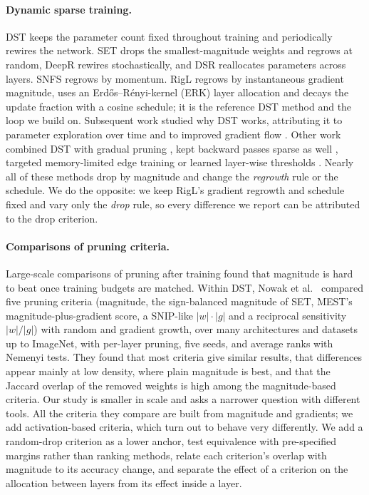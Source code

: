 \paragraph{Dynamic sparse training.}
DST keeps the parameter count fixed throughout training and periodically rewires the network. SET \cite{mocanu2018scalable} drops the smallest-magnitude weights and regrows at random, DeepR \cite{bellec2017deep} rewires stochastically, and DSR \cite{mostafa2019parameter} reallocates parameters across layers. SNFS \cite{dettmers2019sparse} regrows by momentum. RigL \cite{evci2020rigging} regrows by instantaneous gradient magnitude, uses an Erd\H{o}s--R\'enyi-kernel (ERK) layer allocation and decays the update fraction with a cosine schedule; it is the reference DST method and the loop we build on. Subsequent work studied why DST works, attributing it to parameter exploration over time \cite{liu2021itop} and to improved gradient flow \cite{evci2022gradient}. Other work combined DST with gradual pruning \cite{liu2021granet}, kept backward passes sparse as well \cite{jayakumar2020topkast}, targeted memory-limited edge training \cite{yuan2021mest} or learned layer-wise thresholds \cite{kusupati2020soft}. Nearly all of these methods drop by magnitude and change the \emph{regrowth} rule or the schedule. We do the opposite: we keep RigL's gradient regrowth and schedule fixed and vary only the \emph{drop} rule, so every difference we report can be attributed to the drop criterion.

\paragraph{Comparisons of pruning criteria.}
Large-scale comparisons of pruning after training \cite{gale2019state,blalock2020state} found that magnitude is hard to beat once training budgets are matched. Within DST, Nowak et al.\ \cite{nowak2023fantastic} compared five pruning criteria (magnitude, the sign-balanced magnitude of SET, MEST's magnitude-plus-gradient score, a SNIP-like $|w|\cdot|g|$ and a reciprocal sensitivity $|w|/|g|$) with random and gradient growth, over many architectures and datasets up to ImageNet, with per-layer pruning, five seeds, and average ranks with Nemenyi tests. They found that most criteria give similar results, that differences appear mainly at low density, where plain magnitude is best, and that the Jaccard overlap of the removed weights is high among the magnitude-based criteria. Our study is smaller in scale and asks a narrower question with different tools. All the criteria they compare are built from magnitude and gradients; we add activation-based criteria, which turn out to behave very differently. We add a random-drop criterion as a lower anchor, test equivalence with pre-specified margins rather than ranking methods, relate each criterion's overlap with magnitude to its accuracy change, and separate the effect of a criterion on the allocation between layers from its effect inside a layer.

